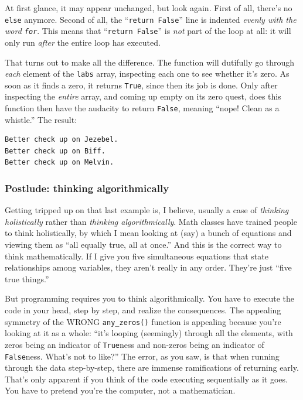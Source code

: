 
At first glance, it may appear unchanged, but look again. First of all, there's
no \texttt{else} anymore. Second of all, the ``\texttt{return False}'' line is
indented \textit{evenly with the word \texttt{for}}. This means that
``\texttt{return False}'' is \textit{not} part of the loop at all: it will only
run \textit{after} the entire loop has executed.

That turns out to make all the difference. The function will dutifully go
through \textit{each} element of the \texttt{labs} array, inspecting each one
to see whether it's zero. As soon as it finds a zero, it returns \texttt{True},
since then its job is done. Only after inspecting the \textit{entire} array,
and coming up empty on its zero quest, does this function then have the
audacity to return \texttt{False}, meaning ``nope! Clean as a whistle.'' The
result:

\begin{Verbatim}[fontsize=\small,samepage=true,frame=leftline,framesep=5mm,framerule=1mm]
Better check up on Jezebel.
Better check up on Biff.
Better check up on Melvin.
\end{Verbatim}

\subsubsection{Postlude: thinking algorithmically}


Getting tripped up on that last example is, I believe, usually a case of
\textit{thinking holistically} rather than \textit{thinking algorithmically}.
Math classes have trained people to think holistically, by which I mean looking
at (say) a bunch of equations and viewing them as ``all equally true, all at
once.'' And this is the correct way to think mathematically. If I give you five
simultaneous equations that state relationships among variables, they aren't
really in any order. They're just ``five true things.''

But programming requires you to think algorithmically. You have to execute the
code in your head, step by step, and realize the consequences. The appealing
symmetry of the WRONG \texttt{any\_zeros()} function is appealing because
you're looking at it as a whole: ``it's looping (seemingly) through all the
elements, with zeros being an indicator of \texttt{True}ness and non-zeros
being an indicator of \texttt{False}ness. What's not to like?'' The error, as
you saw, is that when running through the data step-by-step, there are immense
ramifications of returning early. That's only apparent if you think of the code
executing sequentially as it goes. You have to pretend you're the computer, not
a mathematician.

